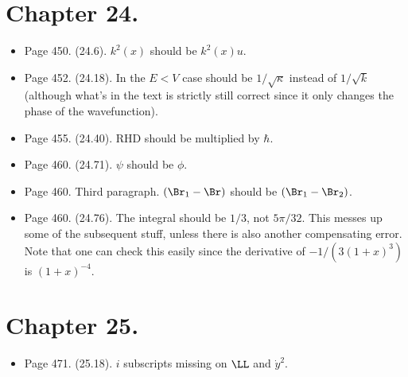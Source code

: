 \section{Chapter 24.}
\begin{itemize}
\item Page 450.  (24.6).  $k^2(x)$ should be $k^2(x) u$.
\item Page 452.  (24.18).  In the $E < V$ case should be $1/\sqrt{\kappa}$ instead of $1/\sqrt{k}$ (although what's in the text is strictly still correct since it only changes the phase of the wavefunction).
\item Page 455.  (24.40).  RHD should be multiplied by $\hbar$.
\item Page 460.  (24.71).  $\psi$ should be $\phi$.
\item Page 460.  Third paragraph.  $(\Br_1 - \Br)$ should be $(\Br_1 - \Br_2)$.
\item Page 460.  (24.76).  The integral should be $1/3$, not $5 \pi/32$.  This messes up some of the subsequent stuff, unless there is also another compensating error.  Note that one can check this easily since the derivative of $-1/(3 (1+x)^3)$ is $(1 + x)^{-4}$.
\end{itemize}

\section{Chapter 25.}
\begin{itemize}
\item Page 471.  (25.18).  $i$ subscripts missing on $\LL$ and $\dot{y}^2$.
\end{itemize}

